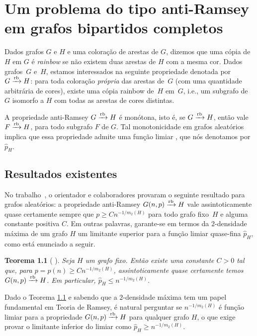 \documentclass[12pt,a4paper]{book}
\def\rbarrow{\xrightarrow[]{\raisebox{0.0mm}[0mm]{$\scriptstyle \rm rb$}}}
\newtheorem{teorema}{Teorema}[chapter]
\begin{document}
\chapter{Um problema do tipo anti-Ramsey em grafos bipartidos completos}\label{cap:anti}

Dados grafos $G$ e $H$ e uma coloração de arestas de $G$, dizemos que uma cópia de $H$ em $G$ é \emph{rainbow} se não existem duas arestas de $H$ com a mesma cor.
%
Dados grafos~$G$ e~$H$, estamos interessados na seguinte propriedade denotada por ${G\rbarrow H}$: para toda coloração \textit{própria} das arestas de~$G$ (com uma quantidade arbitrária de cores),
existe uma cópia rainbow de~$H$ em~$G$, i.e., um subgrafo de $G$ isomorfo a $H$ com todas as arestas de cores distintas.


A propriedade anti-Ramsey ${G\rbarrow H}$ é monótona, isto é, se ${G\rbarrow H}$, então vale ${F\rbarrow H}$, para todo subgrafo $F$ de $G$. Tal monotonicidade em 
grafos aleatórios implica que essa propriedade admite uma função limiar \cite{BoTh87}, que nós denotamos por $\hat{p}_H$. 


\section{Resultados existentes}

No trabalho~\cite{KoKoMo12}, o orientador e colaboradores provaram o seguinte resultado para grafos aleatórios: a propriedade anti-Ramsey $G(n,p)\rbarrow H$ vale assintoticamente quase certamente sempre que $p\geq Cn^{-1/m_2(H)}$ para todo grafo fixo~$H$ e alguma constante positiva $C$.
Em outras palavras, garante-se em termos da $2$-densidade máxima de um grafo $H$ um limitante superior para a função limiar quase-fina $\hat{p}_H$, como está enunciado a seguir.

\begin{teorema}[%
\cite{KoKoMo12}]
    \label{teo:conditional}
         Seja $H$ um grafo fixo. Então existe uma constante $C>0$ tal que, para $p=p(n)\geq Cn^{-1/m_2(H)}$, assintoticamente quase certamente temos ${G(n,p)\rbarrow H}$. 
         Em particular, $\hat{p}_H \leq n^{-1/m_2(H)}$.
  \end{teorema}
    
Dado o Teorema \ref{teo:conditional} e sabendo que a $2$-densidade máxima tem um papel fundamental em Teoria de Ramsey, é natural perguntar se $n^{-1/m_2(H)}$ é função limiar para a propriedade $G(n,p)\rbarrow H$ para qualquer grafo $H$, o que exige provar o limitante inferior do limiar como $\hat{p}_H \geq n^{-1/m_2(H)}$.
\end{document}
